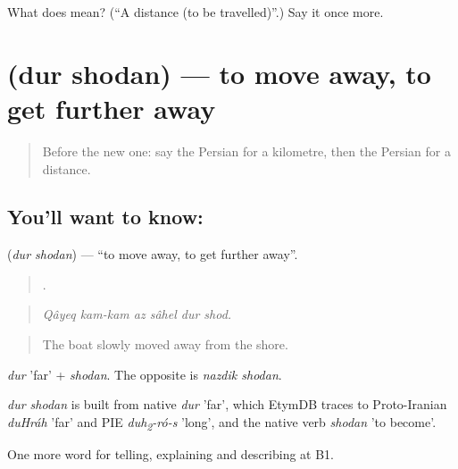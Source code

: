 \begin{tcolorbox}[breakable,colback=teal!4,colframe=teal!35!black,title={Before you move on}]
What does  mean? (\textquotedblleft{}A distance (to be travelled)\textquotedblright{}.) Say it once more.
\end{tcolorbox}
\section[\texorpdfstring{\fa{دور} \fa{شدن} (dur shodan)}{دور شدن (dur shodan)}]{  (dur shodan) — to move away, to get further away}

\label{lesson:FA-C446-dur-shodan}



\begin{quote}
Before the new one: say the Persian for a kilometre, then the Persian for a distance.
\end{quote}

\subsection*{You'll want to know:  }
\textbf{ } (\emph{dur shodan}) — \textquotedblleft{}to move away, to get further away\textquotedblright{}.

\begin{quote}
      .
\end{quote}

\begin{quote}
\emph{Qâyeq kam-kam az sâhel dur shod.}
\end{quote}

\begin{quote}
The boat slowly moved away from the shore.
\end{quote}

\emph{dur} 'far' + \emph{shodan}. The opposite is \emph{nazdik shodan}.

\begin{cousinweb}
\emph{dur shodan} is built from native \emph{dur} 'far', which EtymDB traces to Proto-Iranian \emph{duHráh} 'far' and PIE \emph{duh\textsubscript{2}-ró-s} 'long', and the native verb \emph{shodan} 'to become'.
\end{cousinweb}

\begin{grammarlens}[title={What you've built}]
One more word for telling, explaining and describing at B1.
\end{grammarlens}

